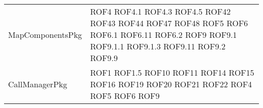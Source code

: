 \begin{longtable}{p{5cm}!{\VRule[1pt]}p{2.5cm}}
		MapComponentsPkg & ROF4 \newline ROF4.1 \newline ROF4.3 \newline ROF4.5 \newline ROF42 \newline ROF43 \newline ROF44 \newline ROF47 \newline ROF48 \newline ROF5 \newline ROF6 \newline ROF6.1 \newline ROF6.11 \newline ROF6.2 \newline ROF9 \newline ROF9.1 \newline ROF9.1.1 \newline ROF9.1.3 \newline ROF9.11 \newline ROF9.2 \newline ROF9.9\\
		CallManagerPkg & ROF1 \newline ROF1.5 \newline ROF10 \newline ROF11 \newline ROF14 \newline ROF15 \newline ROF16 \newline ROF19 \newline ROF20 \newline ROF21 \newline ROF22 \newline ROF4 \newline ROF5 \newline ROF6 \newline ROF9\\

\end{longtable}
